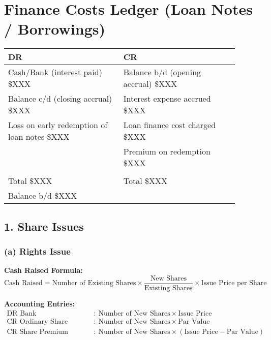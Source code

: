 \vspace{1cm}

\section*{Finance Costs Ledger (Loan Notes / Borrowings)}

\begin{tabular}{@{}p{0.45\linewidth} p{0.45\linewidth}@{}}
\textbf{DR} & \textbf{CR} \\ \midrule
Cash/Bank (interest paid) \hfill \$XXX & Balance b/d (opening accrual) \hfill \$XXX \\
Balance c/d (closing accrual) \hfill \$XXX & Interest expense accrued \hfill \$XXX \\
Loss on early redemption of loan notes \hfill \$XXX & Loan finance cost charged \hfill \$XXX \\
& Premium on redemption \hfill \$XXX \\[3pt]
\multicolumn{2}{c}{\hrulefill} \\
Total \hfill \$XXX & Total \hfill \$XXX \\[6pt]
Balance b/d \hfill \$XXX & \\
\end{tabular}

\subsection*{1. Share Issues}

\subsubsection*{(a) Rights Issue}

\textbf{Cash Raised Formula:}
\[
\text{Cash Raised} = \text{Number of Existing Shares} \times \frac{\text{New Shares}}{\text{Existing Shares}} \times \text{Issue Price per Share}
\]

\textbf{Accounting Entries:}
\[
\begin{aligned}
\text{DR Bank} &: \ \text{Number of New Shares} \times \text{Issue Price} \\
\text{CR Ordinary Share Capital} &: \ \text{Number of New Shares} \times \text{Par Value} \\
\text{CR Share Premium} &: \ \text{Number of New Shares} \times (\text{Issue Price} - \text{Par Value})
\end{aligned}
\]

